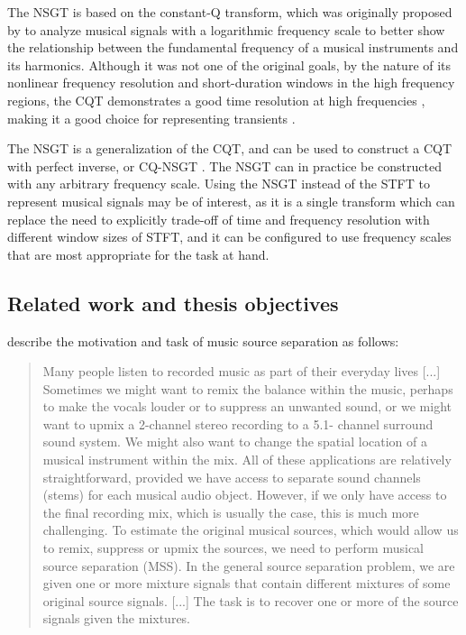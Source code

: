 \documentclass[report.tex]{subfiles}
\begin{document}
The NSGT is based on the constant-Q transform, which was originally proposed by \textcite{jbrown} to analyze musical signals with a logarithmic frequency scale to better show the relationship between the fundamental frequency of a musical instruments and its harmonics. Although it was not one of the original goals, by the nature of its nonlinear frequency resolution and short-duration windows in the high frequency regions, the CQT demonstrates a good time resolution at high frequencies \cite{cqtransient}, making it a good choice for representing transients .

The NSGT is a generalization of the CQT, and can be used to construct a CQT with perfect inverse, or CQ-NSGT \cite{invertiblecqt, variableq1}. The NSGT can in practice be constructed with any arbitrary frequency scale. Using the NSGT instead of the STFT to represent musical signals may be of interest, as it is a single transform which can replace the need to explicitly trade-off of time and frequency resolution with different window sizes of STFT, and it can be configured to use frequency scales that are most appropriate for the task at hand.

\subsection{Related work and thesis objectives}


\textcite{musicsepgood} describe the motivation and task of music source separation as follows:

\begin{quote}
	Many people listen to recorded music as part of their everyday lives [...] Sometimes we might want to remix the balance within the music, perhaps to make the vocals louder or to suppress an unwanted sound, or we might want to upmix a 2-channel stereo recording to a 5.1- channel surround sound system. We might also want to change the spatial location of a musical instrument within the mix. All of these applications are relatively straightforward, provided we have access to separate sound channels (stems) for each musical audio object. However, if we only have access to the final recording mix, which is usually the case, this is much more challenging. To estimate the original musical sources, which would allow us to remix, suppress or upmix the sources, we need to perform musical source separation (MSS). In the general source separation problem, we are given one or more mixture signals that contain different mixtures of some original source signals. [...] The task is to recover one or more of the source signals given the mixtures.
\end{quote}
\end{document}
